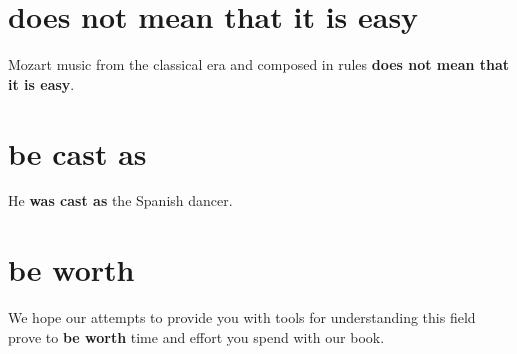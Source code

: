\documentclass[12pt, letterpaper, onecolumn, final]{report}
\begin{document}
\section{does not mean that it is easy}
Mozart music from the classical era and composed in rules \textbf{does not mean that it is easy}.

\section{be cast as}
He \textbf{was cast as} the Spanish dancer.

\section{be worth}
We hope our attempts to provide you with tools for understanding this field prove to \textbf{be worth} time and effort you spend with our book.
\end{document}
